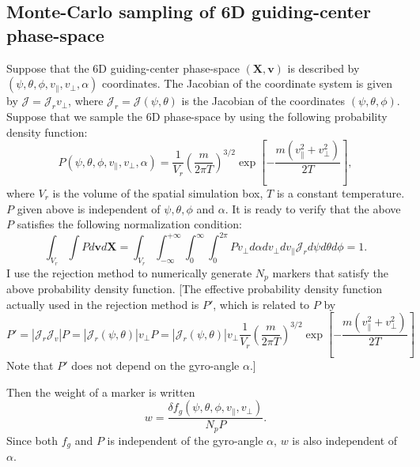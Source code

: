 \documentclass{llncs}
\begin{document}
\subsection{Monte-Carlo sampling of 6D guiding-center phase-space
}\label{19-1-28-1}

Suppose that the 6D guiding-center phase-space $(\mathbf{X}, \mathbf{v})$ is
described by $(\psi, \theta, \phi, v_{\parallel}, v_{\perp}, \alpha)$
coordinates. The Jacobian of the coordinate system is given by $\mathcal{J} =
\mathcal{J}_r v_{\perp} \mathcal{}$, where $\mathcal{J}_r = \mathcal{J} (\psi,
\theta)$ is the Jacobian of the coordinates $(\psi, \theta, \phi)$. Suppose
that we sample the 6D phase-space by using the following probability density
function:
\begin{equation}
  \label{19-1-26-1} P (\psi, \theta, \phi, v_{\parallel}, v_{\perp}, \alpha) =
  \frac{1}{V_r} \left( \frac{m}{2 \pi T} \right)^{3 / 2} \exp \left[ - \frac{m
  (v_{\parallel}^2 + v_{\perp}^2)}{2 T} \right],
\end{equation}
where $V_r$ is the volume of the spatial simulation box, $T$ is a constant
temperature. $P$ given above is independent of $\psi, \theta, \phi$ and
$\alpha$. It is ready to verify that the above $P$ satisfies the following
normalization condition:
\begin{equation}
  \int_{V_r} \int P d\mathbf{v}d\mathbf{X}= \int_{V_r} \int_{- \infty}^{+
  \infty} \int_0^{\infty} \int_0^{2 \pi} P v_{\perp} d \alpha d v_{\perp} d
  v_{\parallel} \mathcal{J}_r d \psi d \theta d \phi = 1.
\end{equation}
I use the rejection method to numerically generate $N_p$ markers that satisfy
the above probability density function. [The effective probability density
function actually used in the rejection method is $P'$, which is related to
$P$ by
\begin{equation}
  P' = | \mathcal{J}_r \mathcal{J}_v | P = | \mathcal{J}_r (\psi, \theta) |
  v_{\perp} P = | \mathcal{J}_r (\psi, \theta) | v_{\perp} \frac{1}{V_r}
  \left( \frac{m}{2 \pi T} \right)^{3 / 2} \exp \left[ - \frac{m
  (v_{\parallel}^2 + v_{\perp}^2)}{2 T} \right]
\end{equation}
Note that $P'$ does not depend on the gyro-angle $\alpha$.]

Then the weight of a marker is written
\begin{equation}
  w = \frac{\delta f_g (\psi, \theta, \phi, v_{\parallel}, v_{\perp})}{N_p P}
  .
\end{equation}
Since both $f_g$ and $P$ is independent of the gyro-angle $\alpha$, $w$ is
also independent of $\alpha$.
\end{document}
